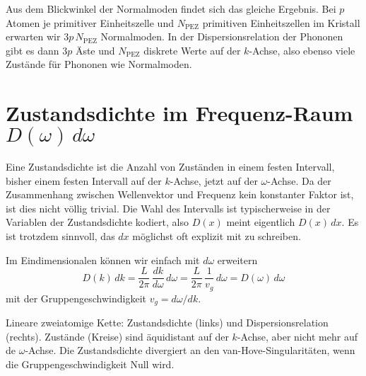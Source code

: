 Aus dem Blickwinkel der Normalmoden findet sich das gleiche Ergebnis. Bei $p$ Atomen je primitiver Einheitszelle und $N_\text{PEZ}$ primitiven Einheitszellen im Kristall erwarten wir $3 p \, N_\text{PEZ}$ Normalmoden. In der Dispersionsrelation der Phononen gibt es dann $3p$ Äste und $N_\text{PEZ}$ diskrete Werte auf der $k$-Achse, also ebenso viele Zustände für Phononen wie Normalmoden.




\section{Zustandsdichte im Frequenz-Raum $D(\omega) \, d\omega$ }

Eine Zustandsdichte ist die Anzahl von Zuständen in einem festen Intervall, bisher einem festen Intervall auf der $k$-Achse, jetzt auf der $\omega$-Achse. Da der Zusammenhang zwischen Wellenvektor und Frequenz kein konstanter Faktor ist, ist dies nicht völlig trivial. Die Wahl des Intervalls ist typischerweise in der Variablen der Zustandsdichte kodiert, also $D(x)$ meint eigentlich $D(x) \, dx$. Es ist trotzdem sinnvoll, das $dx$ möglichst oft explizit mit zu schreiben.

Im Eindimensionalen können wir einfach mit $d \omega$ erweitern
\begin{equation}
D(k) \, dk  =  \frac{L}{2 \pi}\, \frac{dk}{d\omega} \, d\omega 
= \frac{L}{2 \pi}\, \frac{1}{v_g} \, d\omega
= D(\omega) \, d\omega
\end{equation}
mit der Gruppengeschwindigkeit $v_g = d\omega / dk$.

\begin{marginfigure}

\caption{Lineare zweiatomige Kette:  Zustandsdichte (links) und Dispersionsrelation (rechts). Zustände (Kreise) sind äquidistant auf der $k$-Achse, aber nicht mehr auf de $\omega$-Achse. Die Zustandsdichte divergiert an den van-Hove-Singularitäten, wenn die Gruppengeschwindigkeit Null wird.}
\end{marginfigure}


